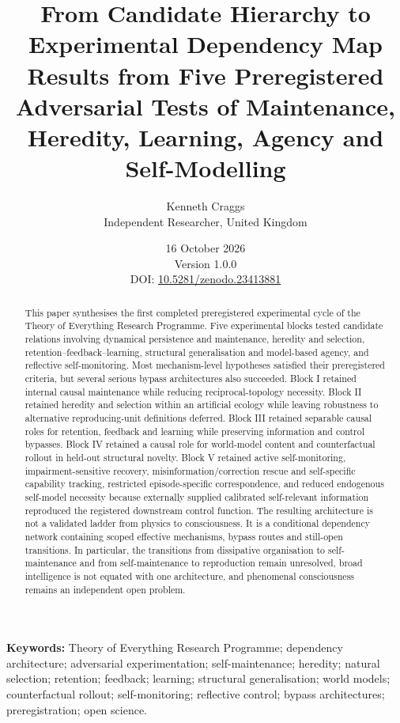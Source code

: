 \documentclass[11pt,a4paper]{article}
\title{\textbf{From Candidate Hierarchy to Experimental Dependency Map}\\
\large Results from Five Preregistered Adversarial Tests of Maintenance, Heredity, Learning, Agency and Self-Modelling}
\author{Kenneth Craggs\\Independent Researcher, United Kingdom}
\date{16 October 2026\\Version 1.0.0\\DOI: \href{https://doi.org/10.5281/zenodo.23413881}{10.5281/zenodo.23413881}}
\begin{document}
\maketitle

\begin{abstract}
This paper synthesises the first completed preregistered experimental cycle of the Theory of Everything Research Programme. Five experimental blocks tested candidate relations involving dynamical persistence and maintenance, heredity and selection, retention--feedback--learning, structural generalisation and model-based agency, and reflective self-monitoring. Most mechanism-level hypotheses satisfied their preregistered criteria, but several serious bypass architectures also succeeded. Block I retained internal causal maintenance while reducing reciprocal-topology necessity. Block II retained heredity and selection within an artificial ecology while leaving robustness to alternative reproducing-unit definitions deferred. Block III retained separable causal roles for retention, feedback and learning while preserving information and control bypasses. Block IV retained a causal role for world-model content and counterfactual rollout in held-out structural novelty. Block V retained active self-monitoring, impairment-sensitive recovery, misinformation/correction rescue and self-specific capability tracking, restricted episode-specific correspondence, and reduced endogenous self-model necessity because externally supplied calibrated self-relevant information reproduced the registered downstream control function. The resulting architecture is not a validated ladder from physics to consciousness. It is a conditional dependency network containing scoped effective mechanisms, bypass routes and still-open transitions. In particular, the transitions from dissipative organisation to self-maintenance and from self-maintenance to reproduction remain unresolved, broad intelligence is not equated with one architecture, and phenomenal consciousness remains an independent open problem.
\end{abstract}

\noindent\textbf{Keywords:} Theory of Everything Research Programme; dependency architecture; adversarial experimentation; self-maintenance; heredity; natural selection; retention; feedback; learning; structural generalisation; world models; counterfactual rollout; self-monitoring; reflective control; bypass architectures; preregistration; open science.
\end{document}
